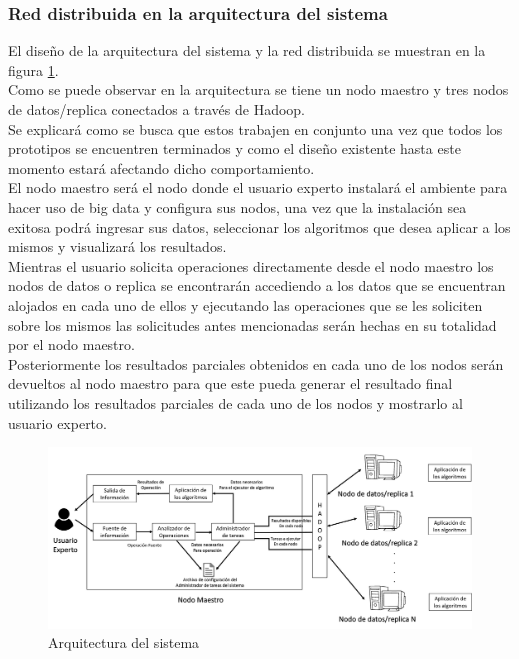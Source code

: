 \subsubsection{Red distribuida en la arquitectura del sistema}
El diseño de la arquitectura del sistema y la red distribuida se muestran en la figura \ref{fig:red}.
\\ 
Como se puede observar en la arquitectura se tiene un nodo maestro y tres nodos de datos/replica conectados a través de Hadoop.
\\
Se explicará como se busca que estos trabajen en conjunto una vez que todos los prototipos se encuentren terminados y como el diseño existente hasta este momento estará afectando dicho comportamiento.
\\
El nodo maestro será el nodo donde el usuario experto instalará el ambiente para hacer uso de big data y configura sus nodos, una vez que la instalación sea exitosa podrá ingresar sus datos, seleccionar los algoritmos que desea aplicar a los mismos y visualizará los resultados.
\\
Mientras el usuario solicita operaciones directamente desde el nodo maestro los nodos de datos o replica se encontrarán accediendo a los datos que se encuentran alojados en cada
uno de ellos y ejecutando las operaciones que se les soliciten sobre los mismos las solicitudes antes mencionadas serán hechas en su totalidad por el nodo maestro. 
\\
Posteriormente los resultados parciales obtenidos en cada uno de los nodos serán devueltos al nodo maestro para que este pueda generar el resultado final utilizando los resultados parciales de cada uno de los nodos y mostrarlo al usuario experto.

\begin{figure}[!htbp]
	\hypertarget{fig:red}{\hspace{1pt}}
	\begin{center}
		\includegraphics[width=.7\textwidth]{capitulo3/images/im1.png}
		\caption{Arquitectura del sistema}
		\label{fig:red}
	\end{center}
\end{figure}

